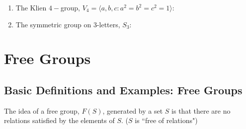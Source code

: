 \documentclass[12pt, a4paper, twoside, openright, titlepage]{book}
\begin{document}
\begin{eg}{}{}
\begin{enumerate}
\begin{figure}[H]
        \end{figure}
        \item The Klien $4-$group, $V_4 = \langle a,b,c: a^2=b^2=c^2=1\rangle$:
        \begin{figure}[H]
            \centering
            \label{fig:V4Lattice}
        \end{figure}
        \item The symmetric group on 3-letters, $S_3$:
        \begin{figure}[H]
            \centering
            \label{fig:S3Lattice}
        \end{figure}
    \end{enumerate}
\end{eg}


\chapter{\textsection\textsection Free Groups}

\section{\textsection Basic Definitions and Examples: Free Groups}

\begin{rmk}{}{}
        The idea of a free group, $F(S)$, generated by a set $S$ is that there are no relations satisfied by the elements of $S$. ($S$ is ``free of relations")
\end{rmk}
\end{document}
